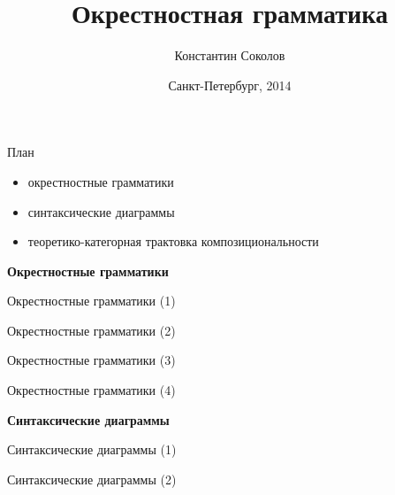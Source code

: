 \documentclass{beamer}
\begin{document}
\title{\Large{Окрестностная грамматика}}
\author{Константин Соколов}
\date{Санкт-Петербург, 2014} 
\begin{frame}
    \thispagestyle{empty}
    \titlepage
\end{frame}

\begin{frame}{План}
\setcounter{framenumber}{1}
    \begin{itemize}
		\item окрестностные грамматики
		\item синтаксические диаграммы
		\item теоретико-категорная трактовка композициональности
    \end{itemize}
\end{frame}



\begin{frame}{}
\begin{center}
	\textbf{Окрестностные грамматики}
\end{center}
\end{frame}

\begin{frame}{Окрестностные грамматики (1)}
\end{frame}

\begin{frame}{Окрестностные грамматики (2)}
\end{frame}

\begin{frame}{Окрестностные грамматики (3)}
\end{frame}

\begin{frame}{Окрестностные грамматики (4)}
\end{frame}



\begin{frame}{}
\begin{center}
	\textbf{Синтаксические диаграммы}
\end{center}
\end{frame}

\begin{frame}{Синтаксические диаграммы (1)}
\end{frame}

\begin{frame}{Синтаксические диаграммы (2)}
\end{frame}
\end{document}
